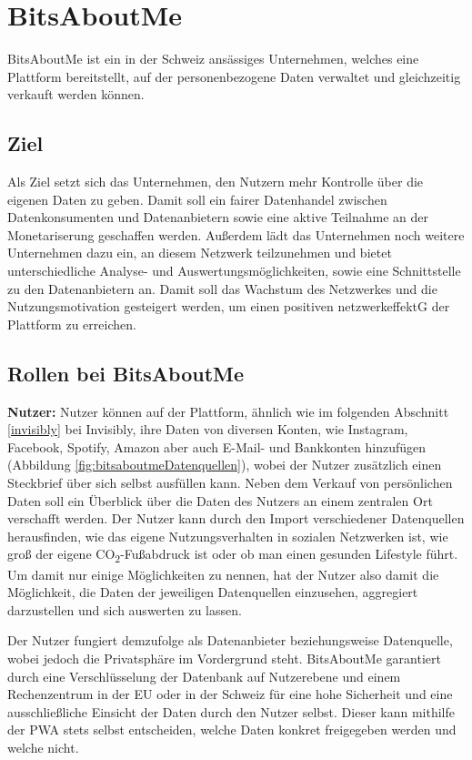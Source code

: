 \section{BitsAboutMe}
BitsAboutMe ist ein in der Schweiz ansässiges Unternehmen, welches eine Plattform bereitstellt, auf der personenbezogene Daten verwaltet und gleichzeitig verkauft werden können.

\subsection{Ziel}
Als Ziel setzt sich das Unternehmen, den Nutzern mehr Kontrolle über die eigenen Daten zu geben. Damit soll ein fairer Datenhandel zwischen Datenkonsumenten und Datenanbietern sowie eine aktive Teilnahme an der Monetariserung geschaffen werden. Außerdem lädt das Unternehmen noch weitere Unternehmen dazu ein, an diesem Netzwerk teilzunehmen und bietet unterschiedliche Analyse- und Auswertungsmöglichkeiten, sowie eine Schnittstelle zu den Datenanbietern an. Damit soll das Wachstum des Netzwerkes und die Nutzungsmotivation gesteigert werden, um einen positiven \gls{netzwerkeffektG} der Plattform zu erreichen.

\subsection{Rollen bei BitsAboutMe}
\textbf{Nutzer:} Nutzer können auf der Plattform, ähnlich wie im folgenden Abschnitt \ref{invisibly} bei Invisibly, ihre Daten von diversen Konten, wie Instagram, Facebook, Spotify, Amazon aber auch E-Mail- und Bankkonten hinzufügen (Abbildung \ref{fig:bitsaboutmeDatenquellen}), wobei der Nutzer zusätzlich einen Steckbrief über sich selbst ausfüllen kann. Neben dem Verkauf von persönlichen Daten soll ein Überblick über die Daten des Nutzers an einem zentralen Ort verschafft werden. Der Nutzer kann durch den Import verschiedener Datenquellen herausfinden, wie das eigene Nutzungsverhalten in sozialen Netzwerken ist, wie groß der eigene CO\textsubscript{2}-Fußabdruck ist oder ob man einen gesunden Lifestyle führt. Um damit nur einige Möglichkeiten zu nennen, hat der Nutzer also damit die Möglichkeit, die Daten der jeweiligen Datenquellen einzusehen, aggregiert darzustellen und sich auswerten zu lassen. \newline

\noindent Der Nutzer fungiert demzufolge als Datenanbieter beziehungsweise Datenquelle, wobei jedoch die Privatsphäre im Vordergrund steht. BitsAboutMe garantiert durch eine Verschlüsselung der Datenbank auf Nutzerebene und einem Rechenzentrum in der EU oder in der Schweiz für eine hohe Sicherheit und eine ausschließliche Einsicht der Daten durch den Nutzer selbst. Dieser kann mithilfe der \gls{PWA} stets selbst entscheiden, welche Daten konkret freigegeben werden und welche nicht.\newline

